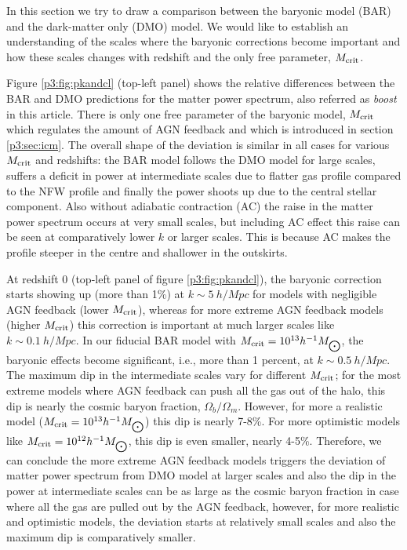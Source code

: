 \documentclass[
  11pt,
  twoside,
  openright,
  titlepage,
  headings=optiontoheadandtoc
]{scrbook}
\begin{document}
In this section we try to draw a comparison between the baryonic model (BAR) and the dark-matter only (DMO) model. We would like to establish an understanding of the scales where the baryonic corrections become important and how these scales changes with redshift and the only free parameter, $M_{\rm crit}$.

Figure \ref{p3:fig:pkandcl} (top-left panel) shows the relative differences between the BAR and DMO predictions for the matter power spectrum, also referred as {\it boost} in this article. There is only one free parameter of the baryonic model, $M_{\rm crit}$ which regulates the amount of AGN feedback and which is introduced in section \ref{p3:sec:icm}. The overall shape of the deviation is similar in all cases for various $M_{\rm crit}$ and redshifts: the BAR model follows the DMO model for large scales, suffers a deficit in power at intermediate scales due to flatter gas profile compared to the NFW profile and finally the power shoots up due to the central stellar component. Also without adiabatic contraction (AC) the raise in the matter power spectrum occurs at very small scales, but including AC effect this raise can be seen at comparatively lower $k$ or larger scales. This is because AC makes the profile steeper in the centre and shallower in the outskirts.

At redshift 0 (top-left panel of figure \ref{p3:fig:pkandcl}), the baryonic correction starts showing up (more than 1\%) at $k \sim 5\  h/Mpc$ for models with negligible AGN feedback (lower $M_{\rm crit}$), whereas for more extreme AGN feedback models (higher $M_{\rm crit}$) this correction is important at much larger scales like $k \sim 0.1\  h/Mpc$. In our fiducial BAR model with $M_{\rm crit} = 10^{13} h^{-1} M_{\bigodot}$, the baryonic effects become significant, i.e., more than 1 percent, at $k \sim 0.5\  h/Mpc$. The maximum dip in the intermediate scales vary for different $M_{\rm crit}$; for the most extreme models where AGN feedback can push all the gas out of the halo, this dip is nearly the cosmic baryon fraction, $\Omega_b/\Omega_m$. However, for more a realistic model ($M_{\rm crit} = 10^{13} h^{-1} M_{\bigodot}$) this dip is nearly 7-8\%. For more optimistic models like $M_{\rm crit} = 10^{12} h^{-1} M_{\bigodot}$, this dip is even smaller, nearly 4-5\%. Therefore, we can conclude the more extreme AGN feedback models triggers the deviation of matter power spectrum from DMO model at larger scales and also the dip in the power at intermediate scales can be as large as the cosmic baryon fraction in case where all the gas are pulled out by the AGN feedback, however, for more realistic and optimistic models, the deviation starts at relatively small scales and also the maximum dip is comparatively smaller.
\end{document}
